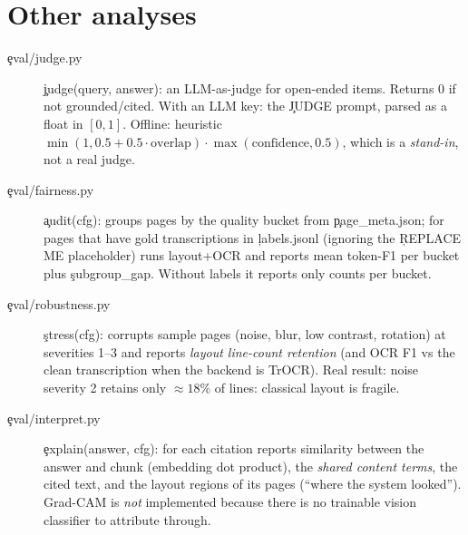 \section{Other analyses}
\begin{description}
 \item[\c{eval/judge.py}] \c{judge(query, answer)}: an LLM-as-judge for open-ended items. Returns 0 if not grounded/cited. With an LLM key: the \c{JUDGE} prompt, parsed as a float in $[0,1]$. Offline: heuristic $\min(1,0.5+0.5\cdot\text{overlap})\cdot\max(\text{confidence},0.5)$, which is a \emph{stand-in}, not a real judge.
 \item[\c{eval/fairness.py}] \c{audit(cfg)}: groups pages by the quality bucket from \c{page\_meta.json}; for pages that have gold transcriptions in \c{labels.jsonl} (ignoring the \c{REPLACE ME} placeholder) runs layout+OCR and reports mean token-F1 per bucket plus \c{subgroup\_gap}. Without labels it reports only counts per bucket.
 \item[\c{eval/robustness.py}] \c{stress(cfg)}: corrupts sample pages (noise, blur, low contrast, rotation) at severities 1--3 and reports \emph{layout line-count retention} (and OCR F1 vs the clean transcription when the backend is TrOCR). Real result: noise severity 2 retains only $\approx18\%$ of lines: classical layout is fragile.
 \item[\c{eval/interpret.py}] \c{explain(answer, cfg)}: for each citation reports similarity between the answer and chunk (embedding dot product), the \emph{shared content terms}, the cited text, and the layout regions of its pages (``where the system looked''). Grad-CAM is \emph{not} implemented because there is no trainable vision classifier to attribute through.
\end{description}
